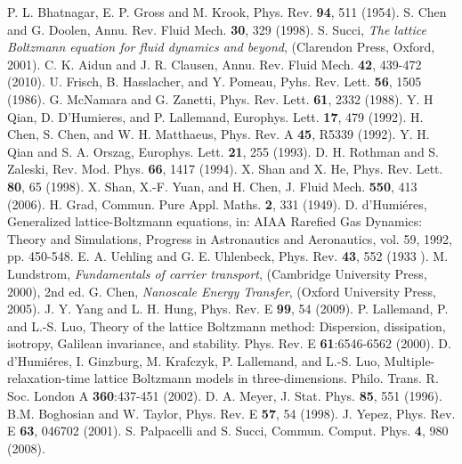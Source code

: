 \documentclass[doublecol]{epl2}
\begin{document}
\begin{thebibliography}{0}

 P. L. Bhatnagar, E. P. Gross and M. Krook, Phys. Rev. {\bf 94}, 511 (1954).
 S. Chen and G. Doolen, Annu. Rev. Fluid Mech. {\bf 30}, 329 (1998).
 S. Succi, {\sl The lattice Boltzmann equation for fluid dynamics and beyond}, (Clarendon Press, Oxford, 2001).
 C. K. Aidun and J. R. Clausen, Annu. Rev. Fluid Mech. {\bf 42}, 439-472 (2010).
 U. Frisch, B. Hasslacher, and Y. Pomeau, Pyhs. Rev. Lett. {\bf 56}, 1505 (1986).
 G. McNamara and G. Zanetti, Phys. Rev. Lett. {\bf 61}, 2332 (1988).
 Y. H Qian, D. D'Humieres, and P. Lallemand, Europhys. Lett. {\bf 17}, 479 (1992).
 H. Chen, S. Chen, and W. H. Matthaeus, Phys. Rev. A {\bf 45}, R5339 (1992).
 Y. H. Qian and S. A. Orszag, Europhys. Lett. {\bf 21}, 255 (1993).
 D. H. Rothman and S. Zaleski, Rev. Mod. Phys. {\bf 66}, 1417 (1994).
 X. Shan and X. He, Phys. Rev. Lett. {\bf 80}, 65 (1998).
 X. Shan, X.-F. Yuan, and H. Chen, J. Fluid Mech. {\bf 550}, 413 (2006).
 H. Grad, Commun. Pure Appl. Maths. {\bf 2}, 331 (1949).
 D. d'Humi\'{e}res, Generalized lattice-Boltzmann equations, in: AIAA Rarefied Gas Dynamics: Theory and Simulations, Progress in Astronautics and Aeronautics, vol. 59, 1992, pp. 450-548.
 E. A. Uehling and G. E. Uhlenbeck, Phys. Rev. {\bf 43}, 552 (1933 ).
 M. Lundstrom, {\sl Fundamentals of carrier transport}, (Cambridge University Press, 2000), 2nd ed.
 G. Chen, {\sl Nanoscale Energy Transfer}, (Oxford University Press, 2005).
 J. Y. Yang and L. H. Hung, Phys. Rev. E {\bf 99}, 54 (2009).
 P. Lallemand, P. and  L.-S. Luo, Theory of the lattice Boltzmann method: Dispersion, dissipation, isotropy, Galilean invariance, and stability. Phys. Rev. E {\bf 61}:6546-6562 (2000).
 D. d'Humi\'{e}res, I. Ginzburg, M. Krafczyk, P. Lallemand, and L.-S. Luo, Multiple-relaxation-time lattice Boltzmann models in three-dimensions.  Philo. Trans. R. Soc. London A {\bf 360}:437-451 (2002).
 D. A. Meyer, J. Stat. Phys. {\bf 85}, 551 (1996).
 B.M. Boghosian and W. Taylor, Phys. Rev. E {\bf 57}, 54 (1998).
 J. Yepez, Phys. Rev. E {\bf 63}, 046702 (2001).
 S. Palpacelli and S. Succi, Commun. Comput. Phys. {\bf 4}, 980 (2008).

\end{thebibliography}
\end{document}
